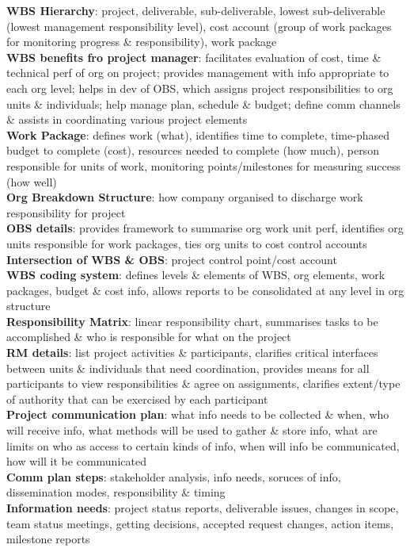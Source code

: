 \documentclass[a4paper]{article}
\begin{document}
\begin{multicols}{2}
        \textbf{WBS Hierarchy}: project, deliverable, sub-deliverable, lowest sub-deliverable (lowest management responsibility level), cost account (group of work packages for monitoring progress \& responsibility), work package\\
        \textbf{WBS benefits fro project manager}: facilitates evaluation of cost, time \& technical perf of org on project; provides management with info appropriate to each org level; helps in dev of OBS, which assigns project responsibilities to org units \& individuals; help manage plan, schedule \& budget; define comm channels \& assists in coordinating various project elements\\
        \textbf{Work Package}: defines work (what), identifies time to complete, time-phased budget to complete (cost), resources needed to complete (how much), person responsible for units of work, monitoring points/milestones for measuring success (how well)\\
        \textbf{Org Breakdown Structure}: how company organised to discharge work responsibility for project\\
        \textbf{OBS details}: provides framework to summarise org work unit perf, identifies org units responsible for work packages, ties org units to cost control accounts\\
        \textbf{Intersection of WBS \& OBS}: project control point/cost account\\
        \textbf{WBS coding system}: defines levels \& elements of WBS, org elements, work packages, budget \& cost info, allows reports to be consolidated at any level in org structure\\
        \textbf{Responsibility Matrix}: linear responsibility chart, summarises tasks to be accomplished \& who is responsible for what on the project\\
        \textbf{RM details}: list project activities \& participants, clarifies critical interfaces between units \& individuals that need coordination, provides means for all participants to view responsibilities \& agree on assignments, clarifies extent/type of authority that can be exercised by each participant\\
        \textbf{Project communication plan}: what info needs to be collected \& when, who will receive info, what methods will be used to gather \& store info, what are limits on who as access to certain kinds of info, when will info be communicated, how will it be communicated\\
        \textbf{Comm plan steps}: stakeholder analysis, info needs, soruces of info, dissemination modes, responsibility \& timing\\
        \textbf{Information needs}: project status reports, deliverable issues, changes in scope, team status meetings, getting decisions, accepted request changes, action items, milestone reports\\
    \end{multicols}
    
\end{document}
